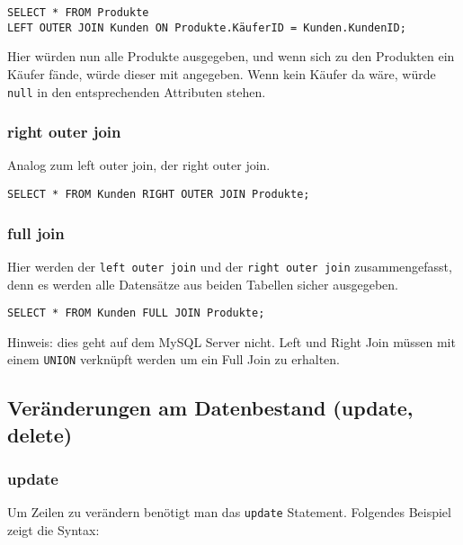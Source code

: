 
\begin{lstlisting}[caption={Left Join SQL}]
SELECT * FROM Produkte 
LEFT OUTER JOIN Kunden ON Produkte.KäuferID = Kunden.KundenID;
\end{lstlisting}

Hier würden nun alle Produkte ausgegeben, und wenn sich zu den Produkten ein Käufer fände, würde dieser mit angegeben. Wenn kein Käufer da wäre, würde \texttt{null} in den entsprechenden Attributen stehen.

\newpage

\subsubsection{right outer join}
Analog zum left outer join, der right outer join.


\begin{lstlisting}[caption={Right Join SQL}]
SELECT * FROM Kunden RIGHT OUTER JOIN Produkte;
\end{lstlisting}

\subsubsection{full join}
Hier werden der \texttt{left outer join} und der \texttt{right outer join} zusammengefasst, denn es werden alle Datensätze aus beiden Tabellen sicher ausgegeben.


\begin{lstlisting}[caption={Full Join SQL}]
SELECT * FROM Kunden FULL JOIN Produkte;
\end{lstlisting}

Hinweis: dies geht auf dem MySQL Server nicht. Left und Right Join müssen mit einem \texttt{UNION} verknüpft werden um ein Full Join zu erhalten.

\subsection{Veränderungen am Datenbestand (update, delete)}

\subsubsection{update}
Um Zeilen zu verändern benötigt man das \texttt{update} Statement. Folgendes Beispiel zeigt die Syntax:

